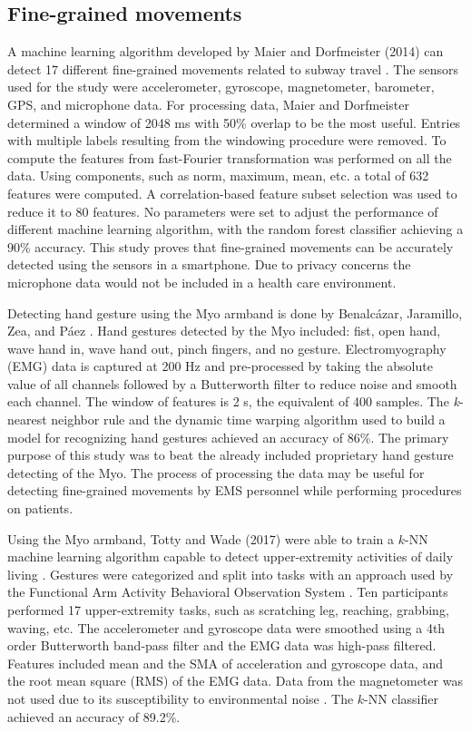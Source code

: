 \subsection{Fine-grained movements}
A machine learning algorithm developed by Maier and Dorfmeister (2014) can detect 17 different fine-grained movements related to subway travel \cite{Dorfmeister2014}. The sensors used for the study were accelerometer, gyroscope, magnetometer, barometer, GPS, and microphone data. For processing data, Maier and Dorfmeister  determined a window of 2048 ms with 50\% overlap to be the most useful. Entries with multiple labels resulting from the windowing procedure were removed.  To compute the features from fast-Fourier transformation was performed on all the data. Using components, such as norm, maximum, mean, etc. a total of 632 features were computed. A correlation-based feature subset selection was used to reduce it to 80 features. No parameters were set to adjust the performance of different machine learning algorithm, with the random forest classifier achieving a 90\% accuracy. This study proves that fine-grained movements can be accurately detected using the sensors in a smartphone. Due to privacy concerns the microphone data would not be included in a health care environment.
\par Detecting hand gesture using the Myo armband is done by Benalc{\'{a}}zar, Jaramillo, Zea, and P{\'{a}}ez \cite{Benalcazar2017}. Hand gestures detected by the Myo included: fist, open hand, wave hand in, wave hand out, pinch fingers, and no gesture. Electromyography (\gls{EMG}) data is captured at 200 Hz and pre-processed by taking the absolute value of all channels followed by a Butterworth filter to reduce noise and smooth each channel. The window of features is 2 s, the equivalent of 400 samples. The \emph{k}-nearest neighbor rule and the dynamic time warping algorithm used to build a model for recognizing hand gestures achieved an accuracy of 86\%. The primary purpose of this study was to beat the already included proprietary hand gesture detecting of the Myo. The process of processing the data may be useful for detecting fine-grained movements by EMS personnel while performing procedures on patients.
\par Using the Myo armband, Totty and Wade (2017) were able to train a $k$-NN machine learning algorithm capable to detect upper-extremity activities of daily living \cite{Totty2017}. Gestures were categorized and split into tasks with an approach used by the Functional Arm Activity Behavioral Observation System \cite{FAABOS}. Ten participants performed 17 upper-extremity tasks, such as scratching leg, reaching, grabbing, waving, etc. The accelerometer and gyroscope data were smoothed using a 4th order Butterworth band-pass filter and the EMG data was high-pass filtered. Features included mean and the \gls{SMA} of acceleration and gyroscope data, and the root mean square (\gls{RMS}) of the \gls{EMG} data. Data from the magnetometer was not used due to its susceptibility to environmental noise \cite{Ahmad2013}. The $k$-NN classifier achieved an accuracy of 89.2\%.
